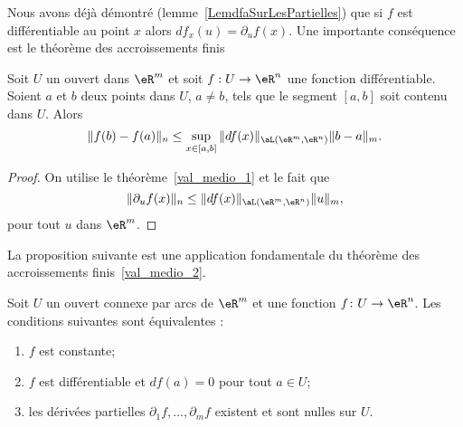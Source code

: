 Nous avons déjà démontré (lemme~\ref{LemdfaSurLesPartielles}) que si $f$ est différentiable au point $x$ alors  $df_x(u)=\partial_uf(x)$. Une importante conséquence est le théorème des accroissements finis
\begin{theorem}\label{val_medio_2}
   Soit $U$ un ouvert dans $\eR^m$ et soit $f:U\to\eR^n$ une fonction différentiable. Soient $a$ et $b$ deux points dans $U$, $a\neq b$, tels que le segment $[a,b]$ soit contenu dans $U$. Alors
   \begin{equation}
        \|f(b)-f(a)\|_n\leq \sup_{x\in[a,b]}\|df(x)\|_{\aL(\eR^m,\eR^n)}\|b-a\|_m.
   \end{equation}
\end{theorem}

\begin{proof}
 On utilise le théorème~\ref{val_medio_1} et le fait que
\[
\|\partial_u f(x)\|_n\leq \|df(x)\|_{\aL(\eR^m,\eR^n)}\|u\|_m,
\]
pour tout $u$ dans $\eR^m$.
\end{proof}

La proposition suivante est une application fondamentale du théorème des accroissements finis~\ref{val_medio_2}.
\begin{proposition}		\label{PropAnnulationEtConstance}
	Soit $U$ un ouvert connexe par arcs de $\eR^m$ et une fonction $f\colon U\to \eR^n$. Les conditions suivantes sont équivalentes :
	\begin{enumerate}
		\item\label{ItemPropCstDiffZeroi}
			$f$ est constante;
		\item\label{ItemPropCstDiffZeroii}
			$f$ est différentiable et $df(a)=0$ pour tout $a\in U$;
		\item\label{ItemPropCstDiffZeroiii}
			les dérivées partielles $\partial_1f,\ldots,\partial_mf$ existent et sont nulles sur $U$.
	\end{enumerate}
\end{proposition}

